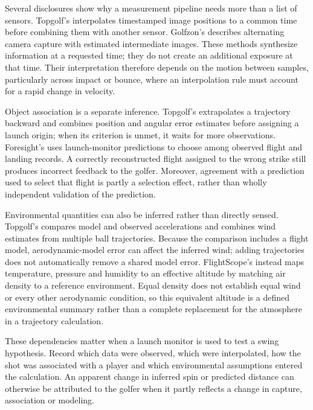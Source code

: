 Several disclosures show why a measurement pipeline needs more than a list of sensors.
Topgolf's  interpolates timestamped image positions to a common time before combining them with another sensor.
Golfzon's  describes alternating camera capture with estimated intermediate images.
These methods synthesize information at a requested time; they do not create an additional exposure at that time.
Their interpretation therefore depends on the motion between samples, particularly across impact or bounce, where an interpolation rule must account for a rapid change in velocity.

Object association is a separate inference.
Topgolf's  extrapolates a trajectory backward and combines position and angular error estimates before assigning a launch origin; when its criterion is unmet, it waits for more observations.
Foresight's  uses launch-monitor predictions to choose among observed flight and landing records.
A correctly reconstructed flight assigned to the wrong strike still produces incorrect feedback to the golfer.
Moreover, agreement with a prediction used to select that flight is partly a selection effect, rather than wholly independent validation of the prediction.

Environmental quantities can also be inferred rather than directly sensed.
Topgolf's  compares model and observed accelerations and combines wind estimates from multiple ball trajectories.
Because the comparison includes a flight model, aerodynamic-model error can affect the inferred wind; adding trajectories does not automatically remove a shared model error.
FlightScope's  instead maps temperature, pressure and humidity to an effective altitude by matching air density to a reference environment.
Equal density does not establish equal wind or every other aerodynamic condition, so this equivalent altitude is a defined environmental summary rather than a complete replacement for the atmosphere in a trajectory calculation.

These dependencies matter when a launch monitor is used to test a swing hypothesis.
Record which data were observed, which were interpolated, how the shot was associated with a player and which environmental assumptions entered the calculation.
An apparent change in inferred spin or predicted distance can otherwise be attributed to the golfer when it partly reflects a change in capture, association or modeling.

